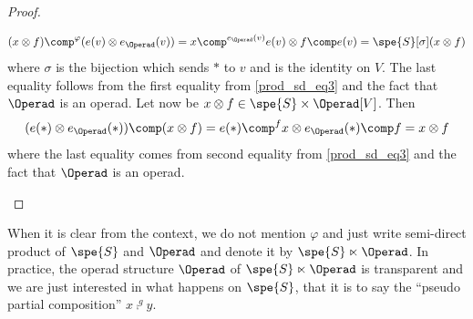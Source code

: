 \begin{proof}
\begin{itemize}
        \begin{equation}
            (x\otimes f)\comp^{\varphi} (e(v)\otimes e_{\Operad}(v))= x\comp^{e_{\Operad}(v)}e(v) \otimes f\comp e(v) = \spe{S}[\sigma](x\otimes f)
        \end{equation}
        where $\sigma$ is the bijection which sends $\ast$ to $v$ and is the identity on $V$. The last 
        equality follows from the first equality from \eqref{prod_sd_eq3} and the fact that $\Operad$ is an 
        operad. Let now be $x\otimes f\in\spe{S}\times\Operad[V]$. Then
        \begin{equation}
            (e(\ast)\otimes e_{\Operad}(\ast))\comp (x\otimes f) = e(\ast)\comp^f x \otimes e_{\Operad}(\ast)\comp f = x\otimes f
        \end{equation}
        where the last equality comes from second equality from \eqref{prod_sd_eq3} and the fact that 
        $\Operad$ is an operad. \qedhere
    \end{itemize}
\end{proof}

When it is clear from the context, we do not mention $\varphi$ and just write semi-direct product of 
$\spe{S}$ and $\Operad$ and denote it by $\spe{S}\ltimes \Operad$. In practice, the operad structure 
$\Operad$ of $\spe{S}\ltimes\Operad$ is transparent and we are just interested in what happens on 
$\spe{S}$, that it is to say the ``pseudo partial composition'' $x\comp^g y$.

